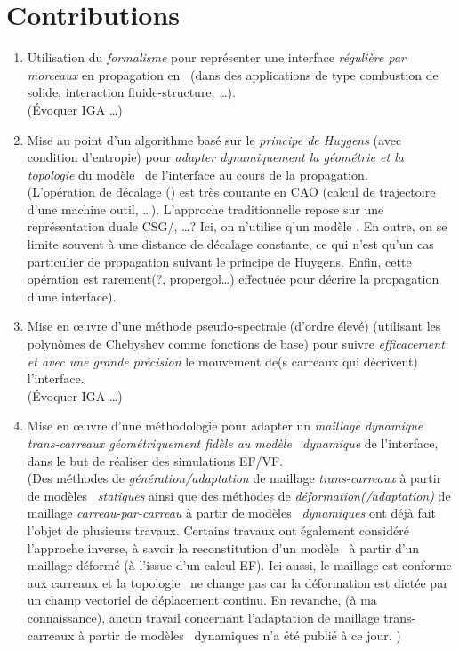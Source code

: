 \section*{Contributions}

\begin{enumerate}
	\item Utilisation du \emph{formalisme \brep} pour représenter une interface \textit{régulière par morceaux} en propagation en \troisD\ (dans des applications de type combustion de solide, interaction fluide-structure, \ldots).\\
	(Évoquer IGA \ldots)
	
	\item Mise au point d’un algorithme basé sur le \emph{principe de Huygens} (avec condition d’entropie) pour \emph{adapter dynamiquement la géométrie et la topologie} du modèle \brep\ de l’interface au cours de la propagation.\\
	(L'opération de décalage () est très courante en CAO (calcul de trajectoire d'une machine outil, \ldots). 
	L'approche traditionnelle repose sur une représentation duale CSG/\brep, \ldots? 
	Ici, on n'utilise q'un modèle \brep.
	En outre, on se limite souvent à une distance de décalage constante, ce qui n'est qu'un cas particulier de propagation suivant le principe de Huygens. 
	Enfin, cette opération est rarement(?, propergol\ldots) effectuée pour décrire la propagation d'une interface).
	
	
	\item Mise en \oe uvre d’une méthode pseudo-spectrale (d’ordre élevé) (utilisant les polynômes de Chebyshev comme fonctions de base) pour suivre \emph{efficacement et avec une grande précision} le mouvement de(s carreaux qui décrivent) l’interface.\\
	(Évoquer IGA \ldots)
	
	\item Mise en \oe uvre d’une méthodologie pour adapter un \emph{maillage dynamique trans-carreaux géométriquement fidèle au modèle \brep\ dynamique} de l’interface, dans le but de réaliser des simulations EF/VF.\\
	(Des méthodes de \textit{génération/adaptation} de maillage \textit{trans-carreaux} à partir de modèles \brep\ \textit{statiques} \cite{noel1995, foucault2008} ainsi que %
	des méthodes de \textit{déformation(/adaptation)} de maillage \textit{carreau-par-carreau} à partir de modèles \brep\ \textit{dynamiques} \cite{martin2017} ont déjà fait l'objet de plusieurs travaux. 
	Certains travaux \cite{louhichi2015} ont également considéré l'approche inverse, à savoir la reconstitution d'un modèle \brep\ à partir d'un maillage déformé (à l'issue d'un calcul EF). Ici aussi, le maillage est conforme aux carreaux et la topologie \brep\ ne change pas car la déformation est dictée par un champ vectoriel de déplacement continu. 
	En revanche, (à ma connaissance), aucun travail concernant l'adaptation de maillage trans-carreaux à partir de modèles \brep\ dynamiques n'a été publié à ce jour.
	)
	

\end{enumerate}
